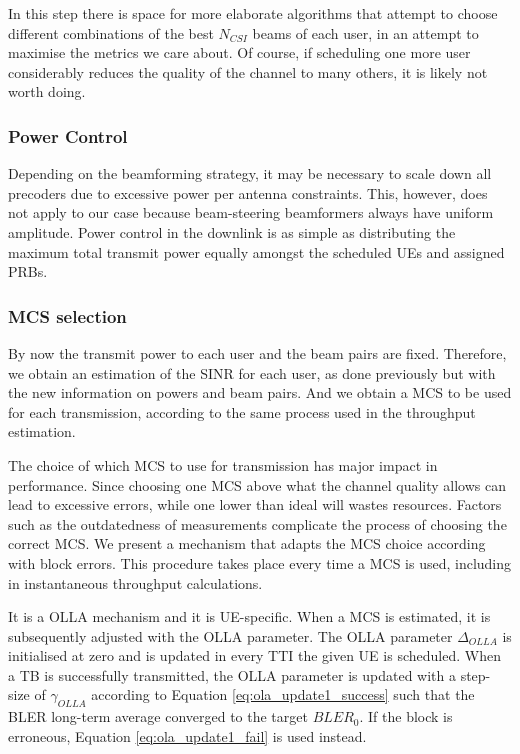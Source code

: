 
In this step there is space for more elaborate algorithms that attempt to choose different combinations of the best $N_{CSI}$ beams of each user, in an attempt to maximise the metrics we care about. Of course, if scheduling one more user considerably reduces the quality of the channel to many others, it is likely not worth doing.


\subsubsection*{Power Control}
Depending on the beamforming strategy, it may be necessary to scale down all precoders due to excessive power per antenna constraints. This, however, does not apply to our case because beam-steering beamformers always have uniform amplitude. Power control in the downlink is as simple as distributing the maximum total transmit power equally amongst the scheduled UEs and assigned PRBs.
    
\subsubsection*{MCS selection}
\label{sec:olla}
By now the transmit power to each user and the beam pairs are fixed. Therefore, we obtain an estimation of the SINR for each user, as done previously but with the new information on powers and beam pairs. And we obtain a MCS to be used for each transmission, according to the same process used in the throughput estimation.

The choice of which MCS to use for transmission has major impact in performance. Since choosing one MCS above what the channel quality allows can lead to excessive errors, while one lower than ideal will wastes resources. Factors such as the outdatedness of measurements complicate the process of choosing the correct MCS. We present a mechanism that adapts the MCS choice according with block errors. This procedure takes place every time a MCS is used, including in instantaneous throughput calculations.

It is a \ac{OLLA} mechanism \cite{olla_ref} and it is UE-specific. When a MCS is estimated, it is subsequently adjusted with the OLLA parameter. The OLLA parameter $\Delta_{OLLA}$ is initialised at zero and is updated in every TTI the given UE is scheduled. When a \ac{TB} is successfully transmitted, the OLLA parameter is updated with a step-size of $\gamma_{OLLA}$ according to Equation \eqref{eq:ola_update1_success} such that the \ac{BLER} long-term average converged to the target $BLER_0$. If the block is erroneous, Equation \eqref{eq:ola_update1_fail} is used instead.

